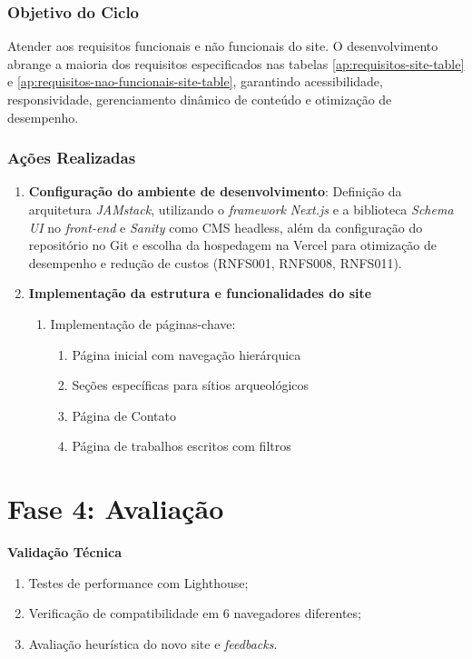 \subsubsection*{Objetivo do Ciclo}
Atender aos requisitos funcionais e não funcionais do site. O desenvolvimento abrange a maioria dos requisitos especificados nas tabelas \ref{ap:requisitos-site-table} e \ref{ap:requisitos-nao-funcionais-site-table}, garantindo acessibilidade, responsividade, gerenciamento dinâmico de conteúdo e otimização de desempenho.

\subsubsection*{Ações Realizadas}
\begin{enumerate}
\item \textbf{Configuração do ambiente de desenvolvimento}: Definição da arquitetura \textit{JAMstack}, utilizando o \textit{framework} \textit{Next.js} e a biblioteca \textit{Schema UI} no \textit{front-end} e \textit{Sanity} como CMS headless, além da configuração do repositório no Git e escolha da hospedagem na Vercel para otimização de desempenho e redução de custos (RNFS001, RNFS008, RNFS011).

    
    \item \textbf{Implementação da estrutura e funcionalidades do site}
    \begin{enumerate}
        \item Implementação de páginas-chave:
        \begin{enumerate}
            \item Página inicial com navegação hierárquica
            \item Seções específicas para sítios arqueológicos
            \item Página de Contato
            \item Página de trabalhos escritos com filtros
        \end{enumerate}
    \end{enumerate}
    
\end{enumerate}

\section{Fase 4: Avaliação} \label{sec:avaliacao-dsr}

    \textbf{Validação Técnica}
    \begin{enumerate}
        \item Testes de performance com Lighthouse;
        \item Verificação de compatibilidade em 6 navegadores diferentes;
        \item Avaliação heurística do novo site e \textit{feedbacks}.
    \end{enumerate}
    

